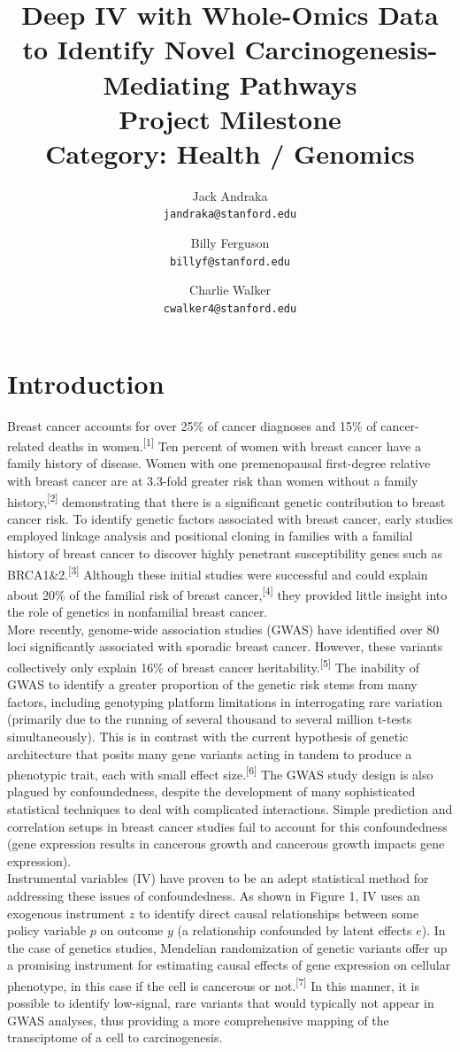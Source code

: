 \documentclass[10.5pt, oneside, twocolumn]{article}   	%
\title{Deep IV with Whole-Omics Data to Identify Novel Carcinogenesis-Mediating Pathways \\
	\vspace{3mm}
	\large Project Milestone \\
	\large Category: Health / Genomics}
\author{
	Jack Andraka\\ 
	\texttt{jandraka@stanford.edu}
	\and
	Billy Ferguson\\
	\texttt{billyf@stanford.edu}
	\and
	Charlie Walker\\
	\texttt{cwalker4@stanford.edu}
}
\date{}							%
\begin{document}
\maketitle
\section{Introduction}
Breast cancer accounts for over 25\% of cancer diagnoses and 15\% of cancer-related deaths in women.\textsuperscript{[1]} Ten percent of women with breast cancer have a family history of disease. Women with one premenopausal first-degree relative with breast cancer are at 3.3-fold greater risk than women without a family history,\textsuperscript{[2]} demonstrating that there is a significant genetic contribution to breast cancer risk. To identify genetic factors associated with breast cancer, early studies employed linkage analysis and positional cloning in families with a familial history of breast cancer to discover highly penetrant susceptibility genes such as BRCA1\&2.\textsuperscript{[3]} Although these initial studies were successful and could explain about 20\% of the familial risk of breast cancer,\textsuperscript{[4]} they provided little insight into the role of genetics in nonfamilial breast cancer. \\

More recently, genome-wide association studies (GWAS) have identified over 80 loci significantly associated with sporadic breast cancer. However, these variants collectively only explain 16\% of breast cancer heritability.\textsuperscript{[5]} The inability of GWAS to identify a greater proportion of the genetic risk stems from many factors, including genotyping platform limitations in interrogating rare variation (primarily due to the running of several thousand to several million t-tests simultaneously). This is in contrast with the current hypothesis of genetic architecture that posits many gene variants acting in tandem to produce a phenotypic trait, each with small effect size.\textsuperscript{[6]} The GWAS study design is also plagued by confoundedness, despite the development of many sophisticated statistical techniques to deal with complicated interactions. Simple prediction and correlation setups in breast cancer studies fail to account for this confoundedness (gene expression results in cancerous growth and cancerous growth impacts gene expression). \\

Instrumental variables (IV) have proven to be an adept statistical method for addressing these issues of confoundedness. As shown in Figure 1, IV uses an exogenous instrument $z$ to identify direct causal relationships between some policy variable $p$ on outcome $y$ (a relationship confounded by latent effects $e$). In the case of genetics studies, Mendelian randomization of genetic variants offer up a promising instrument for estimating causal effects of gene expression on cellular phenotype, in this case if the cell is cancerous or not.\textsuperscript{[7]} In this manner, it is possible to identify low-signal, rare variants that would typically not appear in GWAS analyses, thus providing a more comprehensive mapping of the transciptome of a cell to carcinogenesis. \\
\end{document}
